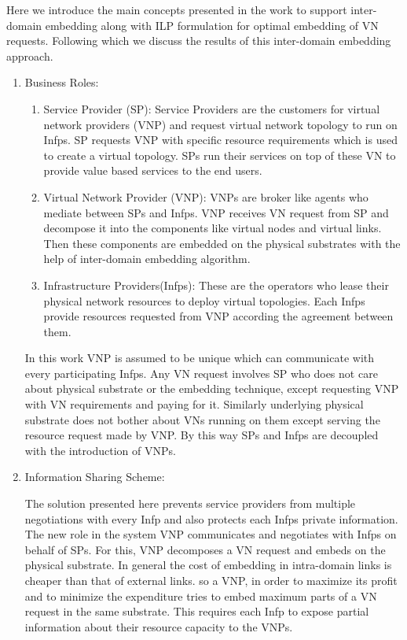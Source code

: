 \documentclass[article,dr=phil,type=msc ,colorback,accentcolor=tud4b]{tudthesis}
\begin{document}
Here we introduce the main concepts presented in the work \cite{6914301} to support inter-domain embedding along with ILP formulation for optimal embedding of VN requests. Following which we discuss the results of this inter-domain embedding approach. 

\begin{enumerate}[label=(\Alph*)]
\item Business Roles: 

\begin{enumerate}
\item Service Provider (SP): Service Providers are the customers for virtual network providers (VNP) and request virtual network topology to run on Infps. SP requests VNP with specific resource requirements which is used to create a virtual topology. SPs run their services on top of these VN to provide value based services to the end users.

\item Virtual Network Provider (VNP): VNPs are broker like agents who mediate between SPs and Infps. VNP receives VN request from SP and decompose it into the components like virtual nodes and virtual links. Then these components are embedded on the physical substrates with the help of inter-domain embedding algorithm. 

\item Infrastructure Providers(Infps): These are the operators who lease their physical network resources to deploy virtual topologies. Each Infps provide resources requested from VNP according the agreement between them.
\end{enumerate}	
In this work VNP is assumed to be unique which can communicate with every participating Infps. Any VN request involves SP who does not care about physical substrate or the embedding technique, except requesting VNP with VN requirements and paying for it. Similarly underlying physical substrate does not bother about VNs running on them except serving the resource request made by VNP. By this way SPs and Infps are decoupled with the introduction of VNPs.
	
\item Information Sharing Scheme:

The solution presented here prevents service providers from multiple negotiations with every Infp and also protects each Infps private information. The new role in the system VNP communicates and negotiates with Infps on behalf of SPs. For this, VNP decomposes a VN request and embeds on the physical substrate. In general the cost of embedding in intra-domain links is cheaper than that of external links. so a VNP, in order to maximize its profit and to minimize the expenditure tries to embed maximum parts of a VN request in the same substrate. This requires each Infp to expose partial information about their resource capacity to the VNPs. 


\end{enumerate}
\end{document}
